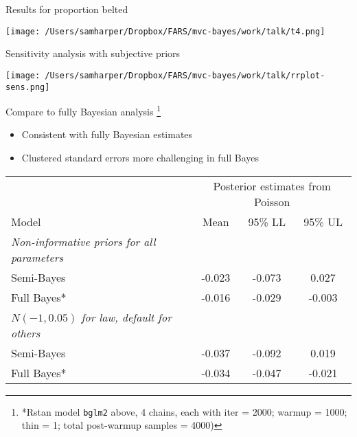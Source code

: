 \documentclass[english]{beamer}\usepackage[]{graphicx}\usepackage[]{color}
\providecommand{\tabularnewline}{\\}
\begin{document}
%
\begin{frame}[plain]{Results for proportion belted}
\begin{center}
\texttt{[image: /Users/samharper/Dropbox/FARS/mvc-bayes/work/talk/t4.png]}
\par\end{center}

\end{frame}
%
\begin{frame}[plain]{Sensitivity analysis with subjective priors}
\begin{center}
\texttt{[image: /Users/samharper/Dropbox/FARS/mvc-bayes/work/talk/rrplot-sens.png]}
\par\end{center}

\end{frame}
%
\begin{frame}[plain]{Compare to fully Bayesian analysis}
\footnote{{*}Rstan model \texttt{bglm2} above, 4 chains, each with iter = 2000;
warmup = 1000; thin = 1; total post-warmup samples = 4000)}
\begin{itemize}
\item Consistent with fully Bayesian estimates
\item Clustered standard errors more challenging in full Bayes
\end{itemize}
\begin{center}
\begin{tabular}{lccc}
\hline 
 &
\multicolumn{3}{c}{Posterior estimates from Poisson}\tabularnewline
\cline{2-4} 
Model  &
Mean &
95\% LL &
95\% UL\tabularnewline
\hline 
\textit{Non-informative priors for all parameters} &
 &
 &
\tabularnewline
\enskip{}Semi-Bayes &
 -0.023 &
-0.073 &
0.027\tabularnewline
\enskip{}Full Bayes{*} &
-0.016 &
-0.029 &
-0.003\tabularnewline
\textit{$N(-1,0.05)$ for law, default for others} &
 &
 &
\tabularnewline
\enskip{}Semi-Bayes &
-0.037 &
-0.092 &
0.019\tabularnewline
\enskip{}Full Bayes{*} &
-0.034 &
-0.047 &
-0.021\tabularnewline
\hline 
\end{tabular}
\par\end{center}

\end{frame}
%
\end{document}
